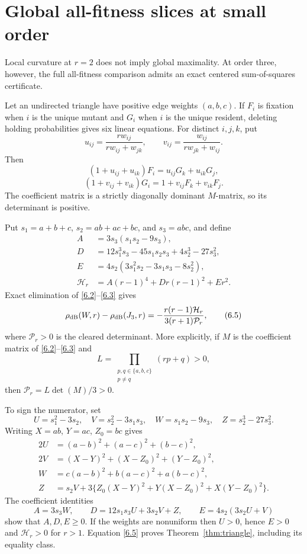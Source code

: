 \section{Global all-fitness slices at small order}\label{sec:small}

Local curvature at $r=2$ does not imply global maximality.  At order three,
however, the full all-fitness comparison admits an exact centered
sum-of-squares certificate.

Let an undirected triangle have positive edge weights $(a,b,c)$.  If $F_i$
is fixation when $i$ is the unique mutant and $G_i$ when $i$ is the unique
resident, deleting holding probabilities gives six linear equations.  For
distinct $i,j,k$, put
\[
 u_{ij}=\frac{rw_{ij}}{rw_{ij}+w_{jk}},\qquad
 v_{ij}=\frac{w_{ij}}{rw_{jk}+w_{ij}}.                       \tag{6.1}\label{6.1}
\]
Then
\[
 (1+u_{ij}+u_{ik})F_i=u_{ij}G_k+u_{ik}G_j,                   \tag{6.2}\label{6.2}
\]
\[
 (1+v_{ij}+v_{ik})G_i=1+v_{ij}F_k+v_{ik}F_j.                 \tag{6.3}\label{6.3}
\]
The coefficient matrix is a strictly diagonally dominant $M$-matrix, so its
determinant is positive.

Put $s_1=a+b+c$, $s_2=ab+ac+bc$, and $s_3=abc$, and define
\[
\begin{aligned}
 A&=3s_3(s_1s_2-9s_3),\\
 D&=12s_1^3s_3-45s_1s_2s_3+4s_2^3-27s_3^2,\\
 E&=4s_2(3s_1^2s_2-3s_1s_3-8s_2^2),\\
 \mathcal H_r&=A(r-1)^4+Dr(r-1)^2+Er^2.
\end{aligned}                                                \tag{6.4}\label{6.4}
\]
Exact elimination of \eqref{6.2}--\eqref{6.3} gives
\[
 \rho_{\mathrm{dB}}(W,r)-\rho_{\mathrm{dB}}(J_3,r)
 =-\frac{r(r-1)\mathcal H_r}{3(r+1)\mathcal P_r},           \tag{6.5}\label{6.5}
\]
where $\mathcal P_r>0$ is the cleared determinant.
More explicitly, if $M$ is the coefficient matrix of
\eqref{6.2}--\eqref{6.3} and
\[
 L=\prod_{\substack{p,q\in\{a,b,c\}\\p\ne q}}(rp+q)>0,
\]
then $\mathcal P_r=L\det(M)/3>0$.

To sign the numerator, set
\[
 U=s_1^2-3s_2,\quad V=s_2^2-3s_1s_3,\quad
 W=s_1s_2-9s_3,\quad Z=s_2^3-27s_3^2.                       \tag{6.6}\label{6.6}
\]
Writing $X=ab$, $Y=ac$, $Z_0=bc$ gives
\[
\begin{aligned}
2U&=(a-b)^2+(a-c)^2+(b-c)^2,\\
2V&=(X-Y)^2+(X-Z_0)^2+(Y-Z_0)^2,\\
W&=c(a-b)^2+b(a-c)^2+a(b-c)^2,\\
Z&=s_2V+3\{Z_0(X-Y)^2+Y(X-Z_0)^2+X(Y-Z_0)^2\}.
\end{aligned}                                                \tag{6.7}\label{6.7}
\]
The coefficient identities
\[
 A=3s_3W,\qquad D=12s_1s_3U+3s_2V+Z,\qquad
 E=4s_2(3s_2U+V)                                           \tag{6.8}\label{6.8}
\]
show that $A,D,E\ge0$.  If the weights are nonuniform then $U>0$, hence
$E>0$ and $\mathcal H_r>0$ for $r>1$.  Equation \eqref{6.5} proves
Theorem~\ref{thm:triangle}, including its equality class.

